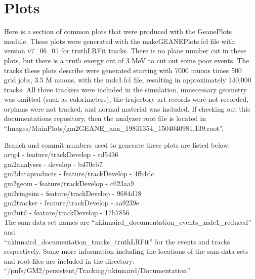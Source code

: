 \newpage
\section{Plots}
\label{sec:Plots}

Here is a section of common plots that were produced with the GeanePlots module. These plots were generated with the makeGEANEPlots.fcl file with version v7\_06\_01 for truthLRFit tracks. There is no plane number cut in these plots, but there is a truth energy cut of 3 MeV to cut out some poor events. The tracks these plots describe were generated starting with 7000 muons times 500 grid jobs, 3.5 M muons, with the mdc1.fcl file, resulting in approximately 140,000 tracks. All three trackers were included in the simulation, unnecessary geometry was omitted (such as calorimeters), the trajectory art records were not recorded, orphans were not tracked, and normal material was included. If checking out this documentations repository, then the analyzer root file is located in ``Images/MainPlots/gm2GEANE\_ana\_19831354\_1504040981.139.root''.

Branch and commit numbers used to generate these plots are listed below: \\

artg4 - feature/trackDevelop - ed5436 \\

gm2analyses - develop - b470cb7 \\

gm2dataproducts - feature/trackDevelop - 4fb1dc \\

gm2geom - feature/trackDevelop - c623aa9 \\

gm2ringsim - feature/trackDevelop - 9684d18 \\

gm2tracker - feature/trackDevelop - aa9239e \\

gm2util - feature/trackDevelop - 17b7856 \\

The sam-data-set names are ``nkinnaird\_documentation\_events\_mdc1\_reduced'' and \\
``nkinnaird\_documentation\_tracks\_truthLRFit'' for the events and tracks respectively.
Some more information including the locations of the sam-data-sets and root files are included in the directory: \\
``/pnfs/GM2/persistent/Tracking/nkinnaird/Documentation''

